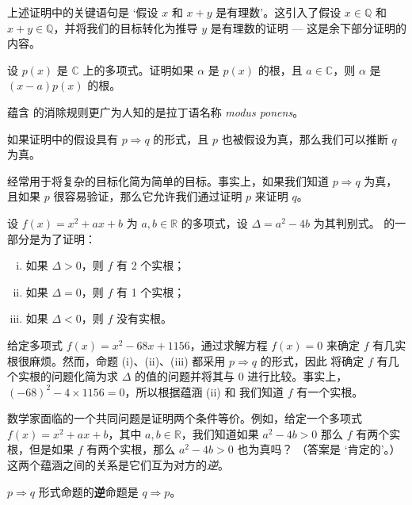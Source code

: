 上述证明中的关键语句是 `假设 $x$ 和 $x+y$ 是有理数'。这引入了假设 $x \in \mathbb{Q}$ 和 $x+y \in \mathbb{Q}$，并将我们的目标转化为推导 $y$ 是有理数的证明 --- 这是余下部分证明的内容。

\begin{exercise}
设 $p(x)$ 是 $\mathbb{C}$ 上的多项式。证明如果 $\alpha$ 是 $p(x)$ 的根，且 $a \in \mathbb{C}$，则 $\alpha$ 是 $(x-a)p(x)$ 的根。
\end{exercise}

蕴含 \elimrule{\Rightarrow} 的消除规则更广为人知的是拉丁语名称 \textit{modus ponens}。

\begin{strategy}
\label{strAssumingImplicationsDirect}
如果证明中的假设具有 $p \Rightarrow q$ 的形式，且 $p$ 也被假设为真，那么我们可以推断 $q$ 为真。
\end{strategy}

 经常用于将复杂的目标化简为简单的目标。事实上，如果我们知道 $p \Rightarrow q$ 为真，且如果 $p$ 很容易验证，那么它允许我们通过证明 $p$ 来证明 $q$。

\begin{example}
设 $f(x) = x^2+ax+b$ 为 $a,b \in \mathbb{R}$ 的多项式，设 $\Delta = a^2-4b$ 为其判别式。  的一部分是为了证明：
\begin{enumerate}[(i)]
\item 如果 $\Delta > 0$，则 $f$ 有 2 个实根；
\item 如果 $\Delta = 0$，则 $f$ 有 1 个实根；
\item 如果 $\Delta < 0$，则 $f$ 没有实根。
\end{enumerate}
给定多项式 $f(x) = x^2-68x+1156$，通过求解方程 $f(x)=0$ 来确定 $f$ 有几实根很麻烦。然而，命题 (i)、(ii)、(iii) 都采用 $p \Rightarrow q$ 的形式，因此  将确定 $f$ 有几个实根的问题化简为求 $\Delta$ 的值的问题并将其与 $0$ 进行比较。事实上，$(-68)^2 - 4 \times 1156 = 0$，所以根据蕴涵 (ii) 和 \elimrule{\Rightarrow} 我们知道 $f$ 有一个实根。
\end{example}

数学家面临的一个共同问题是证明两个条件等价。例如，给定一个多项式 $f(x) = x^2+ax+b$，其中 $a,b \in \mathbb{R}$，我们知道如果 $a^2-4b>0$ 那么 $f$ 有两个实根，但是如果 $f$ 有两个实根，那么 $a^2-4b>0$ 也为真吗？ （答案是 `肯定的'。）这两个蕴涵之间的关系是它们互为对方的\textit{逆}。
\begin{definition}
\label{defConverse}
$p \Rightarrow q$ 形式命题的\textbf{逆}命题是 $q \Rightarrow p$。
\end{definition}

